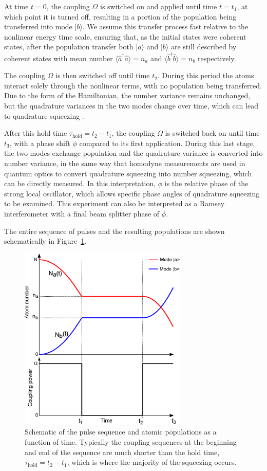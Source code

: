 \documentclass{iopart}
\begin{document}
At time $t=0$, the coupling $\Omega$ is switched on and applied until time $t=t_1$, at which point it is turned off, resulting in a portion of the population being transferred into mode $|b\rangle$. We assume this transfer process fast relative to the nonlinear energy time scale, ensuring that, as the initial states were coherent states, after the population transfer both $|a\rangle$ and $|b\rangle$ are still described by coherent states with mean number $\langle \hat{a}^{\dagger} \hat{a} \rangle = n_a$ and $\langle \hat{b}^{\dagger} \hat{b} \rangle = n_b$ respectively.

The coupling $\Omega$ is then switched off until time $t_2$. During this period the atoms interact solely through the nonlinear terms, with no population being transferred. Due to the form of the Hamiltonian, the number variance remains unchanged, but the quadrature variances in the two modes change over time, which can lead to quadrature squeezing \cite{johnssonET2007}.

After this hold time $\tau_{\mathrm{hold}} = t_2 - t_1 $, the coupling $\Omega$ is switched back on until time $t_3$, with a phase shift $\phi$ compared to its first application. During this last stage, the two modes exchange population and the quadrature variance is converted into number variance, in the same way that homodyne measurements are used in quantum optics to convert quadrature squeezing into number squeezing, which can be directly measured. In this interpretation, $\phi$ is the relative phase of the strong local oscillator, which allows specific phase angles of quadrature squeezing to be examined.  This experiment can also be interpreted as a Ramsey interferometer with a final beam splitter phase of $\phi$.

The entire sequence of pulses and the resulting populations are shown schematically in Figure~\ref{figPulseScheme}.

\begin{figure}
    \centering
    \includegraphics[width=8cm]{figures/pulse_scheme.eps}
    \caption{Schematic of the pulse sequence and atomic populations as a function of time.  Typically the coupling sequences at the beginning and end of the sequence are much shorter than the hold time, $\tau_{\mathrm{hold}} = t_2 - t_1 $, which is where the majority of the squeezing occurs.}
    \label{figPulseScheme}
\end{figure}
\end{document}
